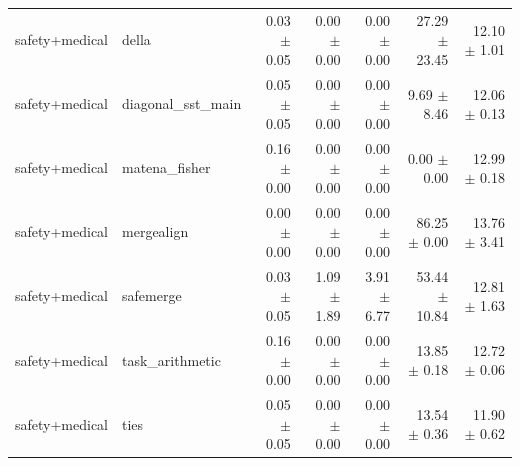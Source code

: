 \documentclass{article}
\begin{document}
\begin{table}[H]
{\begin{tabular}{llrrrrr}
safety+medical & della & 0.03 $\pm$ 0.05 & 0.00 $\pm$ 0.00 & 0.00 $\pm$ 0.00 & 27.29 $\pm$ 23.45 & 12.10 $\pm$ 1.01 \\
safety+medical & diagonal\_sst\_main & 0.05 $\pm$ 0.05 & 0.00 $\pm$ 0.00 & 0.00 $\pm$ 0.00 & 9.69 $\pm$ 8.46 & 12.06 $\pm$ 0.13 \\
safety+medical & matena\_fisher & 0.16 $\pm$ 0.00 & 0.00 $\pm$ 0.00 & 0.00 $\pm$ 0.00 & 0.00 $\pm$ 0.00 & 12.99 $\pm$ 0.18 \\
safety+medical & mergealign & 0.00 $\pm$ 0.00 & 0.00 $\pm$ 0.00 & 0.00 $\pm$ 0.00 & 86.25 $\pm$ 0.00 & 13.76 $\pm$ 3.41 \\
safety+medical & safemerge & 0.03 $\pm$ 0.05 & 1.09 $\pm$ 1.89 & 3.91 $\pm$ 6.77 & 53.44 $\pm$ 10.84 & 12.81 $\pm$ 1.63 \\
safety+medical & task\_arithmetic & 0.16 $\pm$ 0.00 & 0.00 $\pm$ 0.00 & 0.00 $\pm$ 0.00 & 13.85 $\pm$ 0.18 & 12.72 $\pm$ 0.06 \\
safety+medical & ties & 0.05 $\pm$ 0.05 & 0.00 $\pm$ 0.00 & 0.00 $\pm$ 0.00 & 13.54 $\pm$ 0.36 & 11.90 $\pm$ 0.62 \\
\bottomrule
\end{tabular}
}
\end{table}





\end{document}
